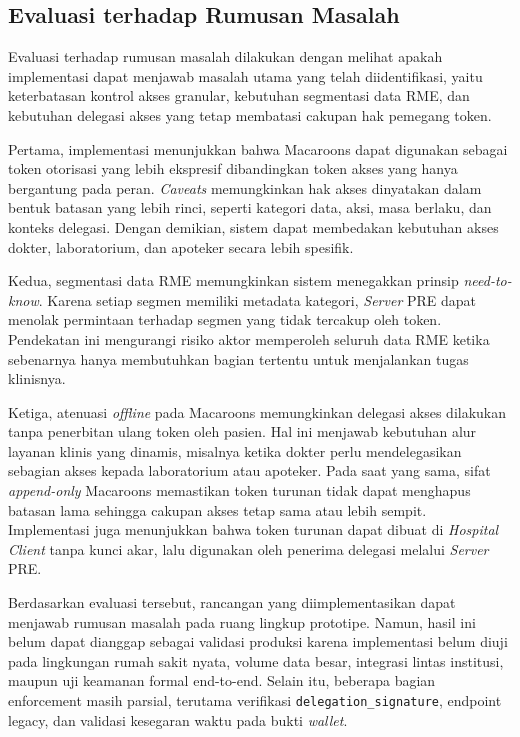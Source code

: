 \subsection{Evaluasi terhadap Rumusan Masalah}
\label{subsec:evaluasi-rumusan-masalah}

Evaluasi terhadap rumusan masalah dilakukan dengan melihat apakah implementasi dapat menjawab masalah utama yang telah diidentifikasi, yaitu keterbatasan kontrol akses granular, kebutuhan segmentasi data RME, dan kebutuhan delegasi akses yang tetap membatasi cakupan hak pemegang token.

Pertama, implementasi menunjukkan bahwa Macaroons dapat digunakan sebagai token otorisasi yang lebih ekspresif dibandingkan token akses yang hanya bergantung pada peran. \textit{Caveats} memungkinkan hak akses dinyatakan dalam bentuk batasan yang lebih rinci, seperti kategori data, aksi, masa berlaku, dan konteks delegasi. Dengan demikian, sistem dapat membedakan kebutuhan akses dokter, laboratorium, dan apoteker secara lebih spesifik.

Kedua, segmentasi data RME memungkinkan sistem menegakkan prinsip \textit{need-to-know}. Karena setiap segmen memiliki metadata kategori, \textit{Server} PRE dapat menolak permintaan terhadap segmen yang tidak tercakup oleh token. Pendekatan ini mengurangi risiko aktor memperoleh seluruh data RME ketika sebenarnya hanya membutuhkan bagian tertentu untuk menjalankan tugas klinisnya.

Ketiga, atenuasi \textit{offline} pada Macaroons memungkinkan delegasi akses dilakukan tanpa penerbitan ulang token oleh pasien. Hal ini menjawab kebutuhan alur layanan klinis yang dinamis, misalnya ketika dokter perlu mendelegasikan sebagian akses kepada laboratorium atau apoteker. Pada saat yang sama, sifat \textit{append-only} Macaroons memastikan token turunan tidak dapat menghapus batasan lama sehingga cakupan akses tetap sama atau lebih sempit. Implementasi juga menunjukkan bahwa token turunan dapat dibuat di \textit{Hospital Client} tanpa kunci akar, lalu digunakan oleh penerima delegasi melalui \textit{Server} PRE.

Berdasarkan evaluasi tersebut, rancangan yang diimplementasikan dapat menjawab rumusan masalah pada ruang lingkup prototipe. Namun, hasil ini belum dapat dianggap sebagai validasi produksi karena implementasi belum diuji pada lingkungan rumah sakit nyata, volume data besar, integrasi lintas institusi, maupun uji keamanan formal end-to-end. Selain itu, beberapa bagian enforcement masih parsial, terutama verifikasi \texttt{delegation\_signature}, endpoint legacy, dan validasi kesegaran waktu pada bukti \textit{wallet}.
